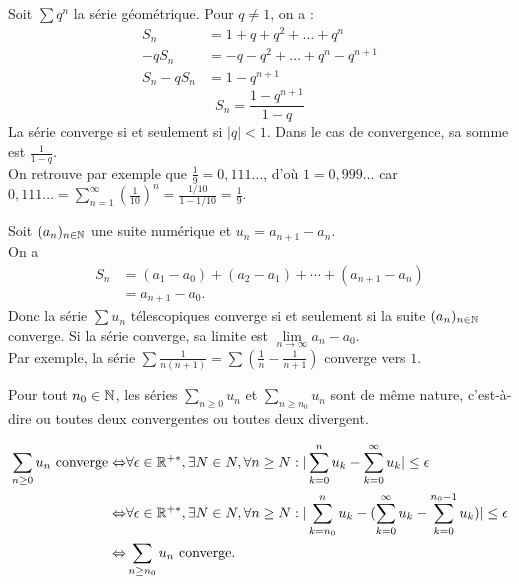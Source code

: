 \documentclass{book}
\begin{document}
\begin{Exemple}
Soit $\sum q^n$ la série géométrique.
Pour $q\ne 1$, on a :
$$\begin{aligned}
	S_{n}&= 1+q+q^2+\dots+q^n  \\
	-qS_{n}&=-q-q^2+\dots+q^n-q^{n+1} \\
	S_{n}-qS_{n}&= 1 -q^{n+1}
\end{aligned}$$
$$ S_{n} = \frac{1-q^{n+1}}{1-q} $$
La série converge  si et seulement si $|q|<1$. Dans le cas de convergence,  sa somme est $\frac{1}{1-q}$. \\
On retrouve par exemple que $\frac 1 9= 0,111\dots$, d'où $1 = 0, 999\dots$ car $0,111\dots=\sum_{n=1}^{\infty}\left(\frac{1}{10}\right)^n=\frac{1/10}{1-1/10}=\frac{1}{9}.$

\end{Exemple}

\begin{Exemple}
Soit $(a_n)_{n\in\mathbb{N}}$ une suite numérique et $u_n = a_{n+1} - a_n$.\\
On a $$\begin{aligned}
S_n &= (a_1 - a_0)+ (a_2 - a_1)+\cdots+(a_{n+1} - a_n)\\&=a_{n+1}-a_0.\end{aligned}$$
Donc la série $\sum u_n$ télescopiques converge si et seulement si la suite $(a_n)_{n\in\mathbb{N}}$ converge. Si la série converge, sa limite est  $\lim\limits_{n\to\infty}a_n-a_0$.\\
Par exemple, la série $\sum \frac{1}{n(n+1)}=\sum\left(\frac{1}{n}-\frac{1}{n+1}\right)$ converge vers $1$. 
\end{Exemple}

\begin{Proposition}
Pour tout $ n_0 \in \mathbb{N}$, les séries $\sum_{n\geq 0}u_n$ et  $\sum_{n\geq n_0}u_n$ sont de même nature,
c'est-à-dire ou toutes deux convergentes ou toutes deux divergent.
\end{Proposition}
\begin{Demonstration}
$$\begin{aligned}
\sum_{n\geq 0}u_n \text{ converge}\Leftrightarrow &\forall \epsilon \in \mathbb{R}^{+*}, \exists N\in N, \forall n \geq N:  |\sum_{k=0}^{n}u_k-\sum_{k=0}^{\infty} u_k|\leq \epsilon\\
\Leftrightarrow &\forall \epsilon \in \mathbb{R}^{+*}, \exists N\in N, \forall n \geq N:  |\sum_{k=n_0}^{n}u_k-(\sum_{k=0}^{\infty} u_k-\sum_{k=0}^{n_0-1}u_k)|\leq \epsilon\\
\Leftrightarrow &\sum_{n\geq n_0}u_n \text{ converge.}
\end{aligned}$$  
\end{Demonstration}
\end{document}
